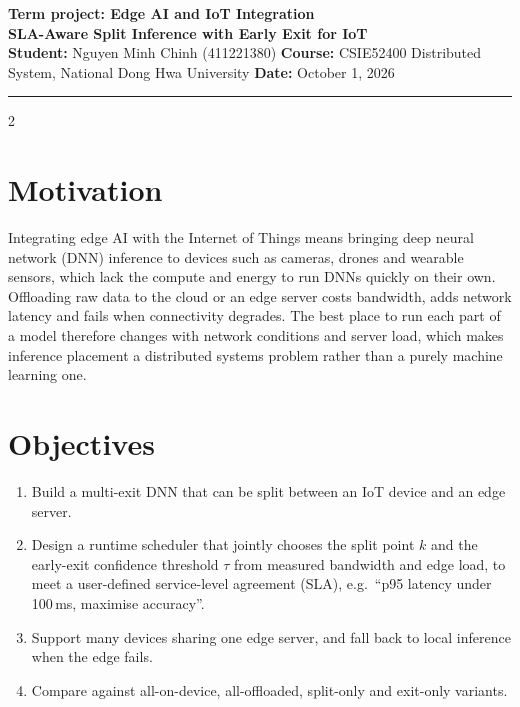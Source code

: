 \documentclass[10pt,a4paper]{article}
\begin{document}
{\sffamily\small\color{accent}\textbf{Term project: Edge AI and IoT Integration}}\\[2pt]
{\large\bfseries SLA-Aware Split Inference with Early Exit for IoT}\\[4pt]
{\sffamily\footnotesize\color{muted}
\textbf{\color{black}Student:} Nguyen Minh Chinh (411221380)\quad
\textbf{\color{black}Course:} CSIE52400 Distributed System, National Dong Hwa University\quad
\textbf{\color{black}Date:} October 1, 2026}\\[-4pt]
{\color{accent}\rule{\textwidth}{1.2pt}}

\vspace{-6pt}
\begin{multicols}{2}

\section{Motivation}
Integrating edge AI with the Internet of Things means bringing deep neural network (DNN) inference to devices such as cameras, drones and wearable sensors, which lack the compute and energy to run DNNs quickly on their own. Offloading raw data to the cloud or an edge server costs bandwidth, adds network latency and fails when connectivity degrades. The best place to run each part of a model therefore changes with network conditions and server load, which makes inference placement a distributed systems problem rather than a purely machine learning one.

\section{Objectives}
\begin{enumerate}
  \item Build a multi-exit DNN that can be split between an IoT device and an edge server.
  \item Design a runtime scheduler that jointly chooses the split point $k$ and the early-exit confidence threshold $\tau$ from measured bandwidth and edge load, to meet a user-defined service-level agreement (SLA), e.g.\ ``p95 latency under 100\,ms, maximise accuracy''.
  \item Support many devices sharing one edge server, and fall back to local inference when the edge fails.
  \item Compare against all-on-device, all-offloaded, split-only and exit-only variants.
\end{enumerate}


\end{multicols}
\end{document}
